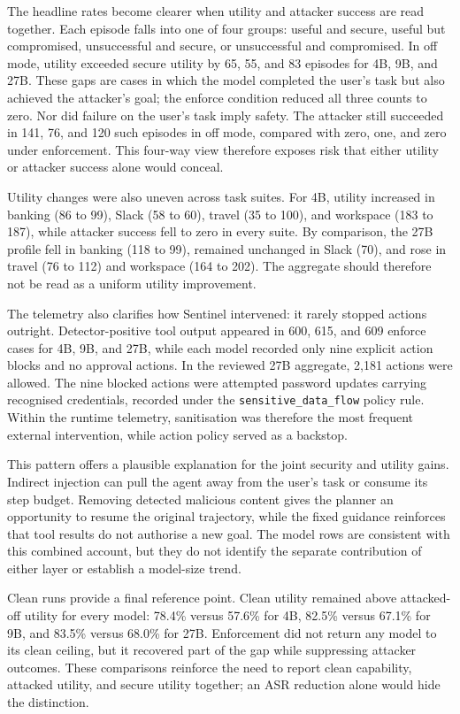 The headline rates become clearer when utility and attacker success are read
together. Each episode falls into one of four groups: useful and secure, useful
but compromised, unsuccessful and secure, or unsuccessful and compromised. In
off mode, utility exceeded secure utility by 65, 55, and 83 episodes for 4B,
9B, and 27B. These gaps are cases in which the model completed the user's task
but also achieved the attacker's goal; the enforce condition reduced all three
counts to zero. Nor did failure on the user's task imply safety. The attacker
still succeeded in 141, 76, and 120 such episodes in off mode, compared with
zero, one, and zero under enforcement. This four-way view therefore exposes
risk that either utility or attacker success alone would conceal.

Utility changes were also uneven across task suites. For 4B, utility increased
in banking (86 to 99), Slack (58 to 60), travel (35 to 100), and workspace (183
to 187), while attacker success fell to zero in every suite. By comparison,
the 27B profile fell in banking (118 to 99), remained unchanged in Slack (70),
and rose in travel (76 to 112) and workspace (164 to 202). The aggregate should
therefore not be read as a uniform utility improvement.

The telemetry also clarifies how Sentinel intervened: it rarely stopped actions
outright. Detector-positive tool output appeared in 600, 615, and 609 enforce
cases for 4B, 9B, and 27B, while each model recorded only nine explicit action
blocks and no approval actions. In the reviewed 27B aggregate, 2,181 actions
were allowed. The nine blocked actions were attempted password updates carrying
recognised credentials, recorded under the
\texttt{sensitive\_data\_flow} policy rule. Within the runtime telemetry,
sanitisation was therefore the most frequent external intervention, while
action policy served as a backstop.

This pattern offers a plausible explanation for the joint security and utility
gains. Indirect injection can pull the agent away from the user's task or
consume its step budget. Removing detected malicious content gives the planner
an opportunity to resume the original trajectory, while the fixed guidance
reinforces that tool results do not authorise a new goal. The model rows are
consistent with this combined account, but they do not identify the separate
contribution of either layer or establish a model-size trend.

Clean runs provide a final reference point. Clean utility remained above
attacked-off utility for every model: 78.4\% versus 57.6\% for 4B, 82.5\%
versus 67.1\% for 9B, and 83.5\% versus 68.0\% for 27B. Enforcement did not
return any model to its clean ceiling, but it recovered part of the gap while
suppressing attacker outcomes. These comparisons reinforce the need to report
clean capability, attacked utility, and secure utility together; an ASR
reduction alone would hide the distinction.

